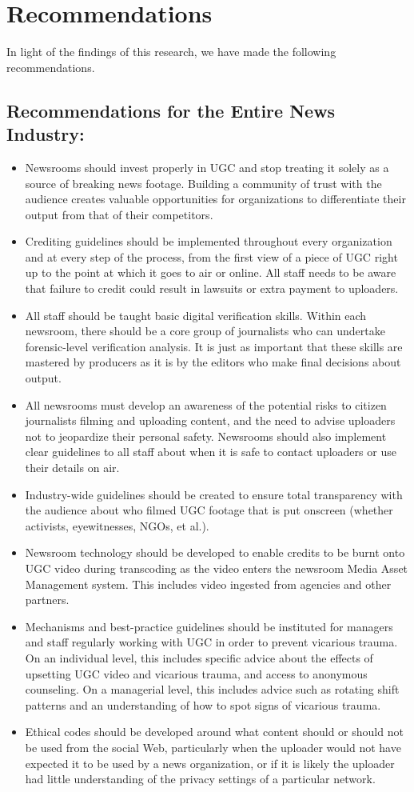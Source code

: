 \documentclass[symmetric, notoc, nobib]{towcenter-book}
\begin{document}
\chapter{Recommendations}
In light of the findings of this research, we have made the
following recommendations.
\section{Recommendations for the Entire News Industry:}
\begin{itemize}
\item Newsrooms should invest properly in UGC and stop treating
it solely as a source of breaking news footage. Building a
community of trust with the audience creates valuable opportunities
for organizations to differentiate their output from that
of their competitors.
\item Crediting guidelines should be implemented throughout every
organization and at every step of the process, from the first view
of a piece of UGC right up to the point at which it goes to air
or online. All staff needs to be aware that failure to credit could
result in lawsuits or extra payment to uploaders.
\item All staff should be taught basic digital verification skills. Within
each newsroom, there should be a core group of journalists who
can undertake forensic-level verification analysis. It is just as
important that these skills are mastered by producers as it is by
the editors who make final decisions about output.
\item All newsrooms must develop an awareness of the potential risks
to citizen journalists filming and uploading content, and the need
to advise uploaders not to jeopardize their personal safety. Newsrooms
should also implement clear guidelines to all staff about
when it is safe to contact uploaders or use their details on air.
\item Industry-wide guidelines should be created to ensure total transparency
with the audience about who filmed UGC footage that is
put onscreen (whether activists, eyewitnesses, NGOs, et al.).
\item Newsroom technology should be developed to enable credits to
be burnt onto UGC video during transcoding as the video enters
the newsroom Media Asset Management system. This includes
video ingested from agencies and other partners.
\item Mechanisms and best-practice guidelines should be instituted
for managers and staff regularly working with UGC in order to
prevent vicarious trauma. On an individual level, this includes
specific advice about the effects of upsetting UGC video and
vicarious trauma, and access to anonymous counseling. On
a managerial level, this includes advice such as rotating
shift patterns and an understanding of how to spot signs of
vicarious trauma.
\item Ethical codes should be developed around what content should
or should not be used from the social Web, particularly when the
uploader would not have expected it to be used by a news organization,
or if it is likely the uploader had little understanding of
the privacy settings of a particular network.
\end{itemize}
\end{document}
